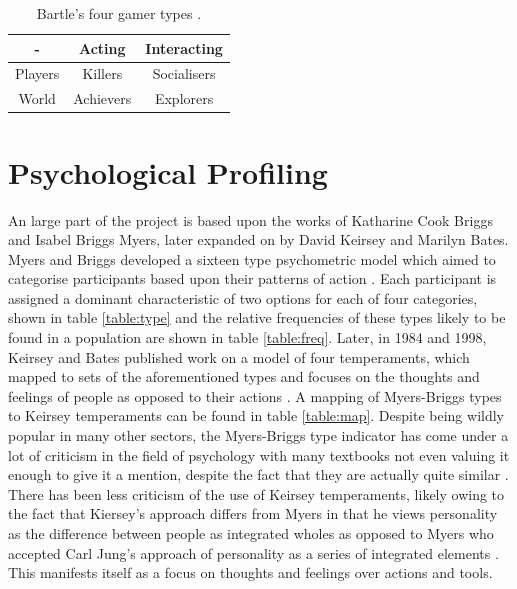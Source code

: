 \documentclass[12pt,a4paper,twoside]{report}
\begin{document}
\begin{table}
\begin{center}
\begin{tabular}{|c|c|c|}
	\hline - & Acting & Interacting \\ 
	\hline Players & Killers & Socialisers \\ 
	\hline World & Achievers & Explorers \\ 
	\hline 
\end{tabular}
\end{center}
\caption{Bartle's four gamer types \cite{bartle1996hearts}.}
\label{table:cards}
\end{table}

\section{Psychological Profiling}

An large part of the project is based upon the works of Katharine Cook Briggs and Isabel Briggs Myers, later expanded on by David Keirsey and Marilyn Bates. Myers and Briggs developed a sixteen type psychometric model which aimed to categorise participants based upon their patterns of action \cite{myers1995gifts}. Each participant is assigned a dominant characteristic of two options for each of four categories, shown in table \ref{table:type} and the relative frequencies of these types likely to be found in a population are shown in table \ref{table:freq}. Later, in 1984 and 1998, Keirsey and Bates published work on a model of four temperaments, which mapped to sets of the aforementioned types and focuses on the thoughts and feelings of people as opposed to their actions \cite{keirsey1998please} \cite{keirsey1984}. A mapping of Myers-Briggs types to Keirsey temperaments can be found in table \ref{table:map}. Despite being wildly popular in many other sectors, the Myers-Briggs type indicator has come under a lot of criticism in the field of psychology with many textbooks not even valuing it enough to give it a mention, despite the fact that they are actually quite similar \cite{lloyd2012myers}. There has been less criticism of the use of Keirsey temperaments, likely owing to the fact that Kiersey's approach differs from Myers in that he views personality as the difference between people as integrated wholes as opposed to Myers who accepted Carl Jung's approach of personality as a series of integrated elements \cite{jung1923psychological} \cite{keirsey1998please}. This manifests itself as a focus on thoughts and feelings over actions and tools.
\end{document}
